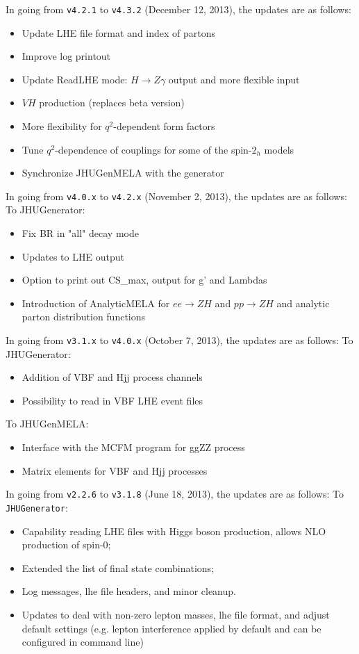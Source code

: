 \documentclass[aps,superscriptaddress,nofootinbib]{revtex4}
\begin{document}
\noindent
In going from \verb|v4.2.1| to \verb|v4.3.2| (December 12, 2013), the updates are as follows:
\begin{itemize}
\item Update LHE file format and index of partons
\item Improve log printout
\item Update ReadLHE mode: $H\to Z\gamma$ output and more flexible input
\item $VH$ production (replaces beta version)
\item More flexibility for $q^2$-dependent form factors
\item Tune $q^2$-dependence of couplings for some of the spin-$2_h$ models
\item Synchronize JHUGenMELA with the generator
\end{itemize}
\noindent
In going from \verb|v4.0.x| to \verb|v4.2.x| (November 2, 2013), the updates are as follows:
To JHUGenerator:
\begin{itemize}
\item Fix BR in "all" decay mode
\item Updates to LHE output
\item Option to print out CS\_max, output for g' and Lambdas
\item Introduction of AnalyticMELA for $ee \to ZH$ and $pp \to ZH$ and analytic parton distribution functions
\end{itemize}
\noindent
In going from \verb|v3.1.x| to \verb|v4.0.x| (October 7, 2013), the updates are as follows:
To JHUGenerator:
\begin{itemize}
\item Addition of VBF and Hjj process channels
\item Possibility to read in VBF LHE event files
\end{itemize}
To JHUGenMELA:
\begin{itemize}
\item Interface with the MCFM program for ggZZ process
\item Matrix elements for VBF and Hjj processes
\end{itemize}
\noindent
In going from \verb|v2.2.6| to \verb|v3.1.8| (June 18, 2013), the updates are as follows:
To \verb|JHUGenerator|:
\begin{itemize}
\item Capability reading LHE files with Higgs boson production, allows NLO production of spin-0;
\item Extended the list of final state combinations;
\item Log messages, lhe file headers, and minor cleanup.
\item Updates to deal with non-zero lepton masses, lhe file format, and adjust default settings (e.g. lepton interference applied by default and can be configured in command line)
\end{itemize}
\end{document}

